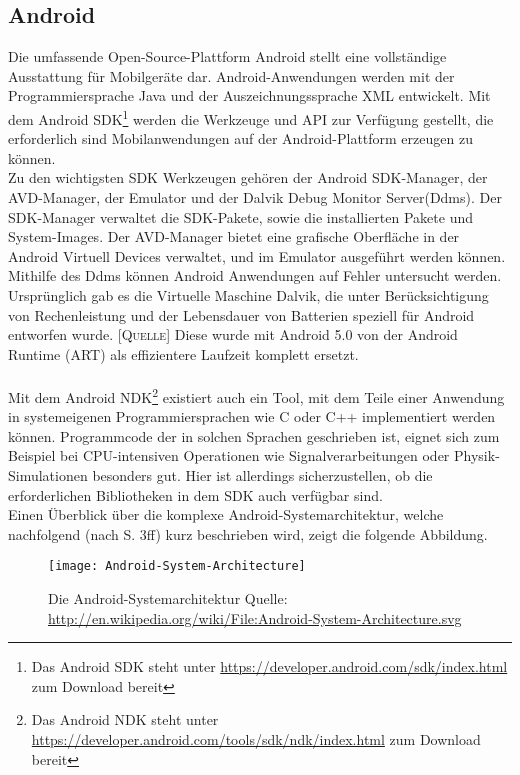\subsection{Android}
Die umfassende Open-Source-Plattform Android stellt eine vollständige Ausstattung für Mobilgeräte dar. Android-Anwendungen werden mit der Programmiersprache Java und der Auszeichnungssprache \gls{XML} entwickelt. Mit dem Android \gls{SDK}\footnote{ Das Android \gls{SDK} steht unter \url{https://developer.android.com/sdk/index.html} zum Download bereit} werden die Werkzeuge und \gls{API} zur Verfügung gestellt, die erforderlich sind Mobilanwendungen auf der Android-Plattform erzeugen zu können.\\ 
Zu den wichtigsten \gls{SDK} Werkzeugen gehören der Android \gls{SDK}-Manager, der AVD-Manager, der Emulator und der Dalvik Debug Monitor Server(Ddms). Der \gls{SDK}-Manager verwaltet die \gls{SDK}-Pakete, sowie die installierten Pakete und System-Images. Der AVD-Manager bietet eine grafische Oberfläche in der Android Virtuell Devices verwaltet, und im Emulator ausgeführt werden können. Mithilfe des Ddms können Android Anwendungen auf Fehler untersucht werden. \cite{android_sdk} \\
Ursprünglich gab es die  Virtuelle Maschine Dalvik, die unter Berücksichtigung von Rechenleistung und der Lebensdauer von Batterien speziell für Android entworfen wurde. [\textsc{Quelle}]
Diese wurde mit Android 5.0 von der Android Runtime (ART) als effizientere Laufzeit komplett ersetzt. \cite{android_5}\\\\
Mit dem Android \gls{NDK}\footnote{ Das Android \gls{NDK} steht unter \url{https://developer.android.com/tools/sdk/ndk/index.html} zum Download bereit} existiert auch ein Tool, mit dem Teile einer Anwendung in systemeigenen Programmiersprachen wie C oder C++ implementiert werden können. Programmcode der in solchen Sprachen geschrieben ist, eignet sich zum Beispiel bei CPU-intensiven Operationen wie Signalverarbeitungen oder Physik-Simulationen besonders gut. Hier ist allerdings sicherzustellen, ob die erforderlichen Bibliotheken in dem \gls{SDK} auch verfügbar sind. \cite{android_ndk} \\
Einen Überblick über die komplexe Android-Systemarchitektur, welche nachfolgend (nach \cite{android} S. 3ff) kurz beschrieben wird, zeigt die folgende Abbildung.
\begin{figure}[H]  
    \centering  
    \texttt{[image: Android-System-Architecture]} 
    \caption[Android-Systemarchitektur]{Die Android-Systemarchitektur Quelle: \url{http://en.wikipedia.org/wiki/File:Android-System-Architecture.svg}}
    \label{fig:android}
\end{figure}
